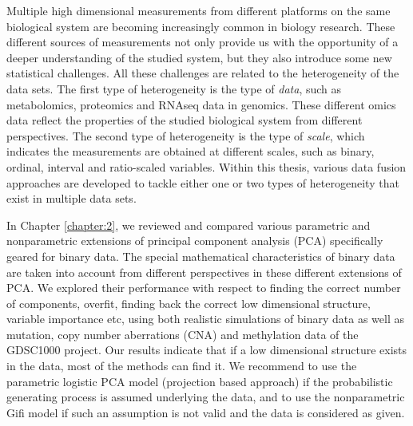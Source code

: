 \summary
Multiple high dimensional measurements from different platforms on the same biological system are becoming increasingly common in biology research. These different sources of measurements not only provide us with the opportunity of a deeper understanding of the studied system, but they also introduce some new statistical challenges. All these challenges are related to the heterogeneity of the data sets. The first type of heterogeneity is the type of \emph{data}, such as metabolomics, proteomics and RNAseq data in genomics. These different omics data reflect the properties of the studied biological system from different perspectives. The second type of heterogeneity is the type of \emph{scale}, which indicates the measurements are obtained at different scales, such as binary, ordinal, interval and ratio-scaled variables. Within this thesis, various data fusion approaches are developed to tackle either one or two types of heterogeneity that exist in multiple data sets.

In Chapter \ref{chapter:2}, we reviewed and compared various parametric and nonparametric extensions of principal component analysis (PCA) specifically geared for binary data. The special mathematical characteristics of binary data are taken into account from different perspectives in these different extensions of PCA. We explored their performance with respect to finding the correct number of components, overfit, finding back the correct low dimensional structure, variable importance etc, using both realistic simulations of binary data as well as mutation, copy number aberrations (CNA) and methylation data of the GDSC1000 project. Our results indicate that if a low dimensional structure exists in the data, most of the methods can find it. We recommend to use the parametric logistic PCA model (projection based approach) if the probabilistic generating process is assumed underlying the data, and to use the nonparametric Gifi model if such an assumption is not valid and the data is considered as given.

